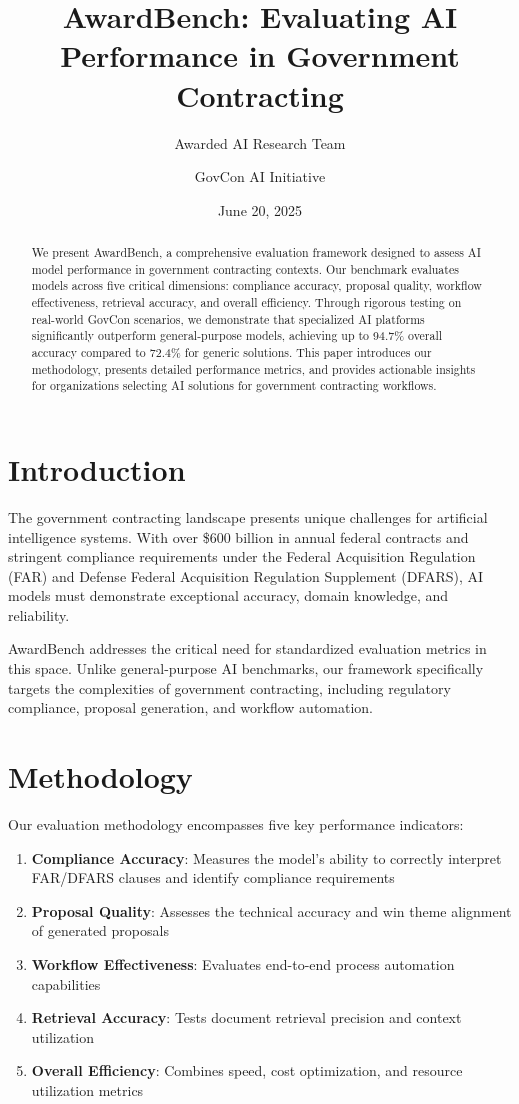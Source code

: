 \documentclass[11pt,a4paper]{article}
\title{AwardBench: Evaluating AI Performance in Government Contracting}
\author{Awarded AI Research Team \and GovCon AI Initiative}
\date{June 20, 2025}
\begin{document}
\maketitle

\begin{abstract}
We present AwardBench, a comprehensive evaluation framework designed to assess AI model performance in government contracting contexts. Our benchmark evaluates models across five critical dimensions: compliance accuracy, proposal quality, workflow effectiveness, retrieval accuracy, and overall efficiency. Through rigorous testing on real-world GovCon scenarios, we demonstrate that specialized AI platforms significantly outperform general-purpose models, achieving up to 94.7\% overall accuracy compared to 72.4\% for generic solutions. This paper introduces our methodology, presents detailed performance metrics, and provides actionable insights for organizations selecting AI solutions for government contracting workflows.
\end{abstract}

\section{Introduction}
The government contracting landscape presents unique challenges for artificial intelligence systems. With over \$600 billion in annual federal contracts and stringent compliance requirements under the Federal Acquisition Regulation (FAR) and Defense Federal Acquisition Regulation Supplement (DFARS), AI models must demonstrate exceptional accuracy, domain knowledge, and reliability.

AwardBench addresses the critical need for standardized evaluation metrics in this space. Unlike general-purpose AI benchmarks, our framework specifically targets the complexities of government contracting, including regulatory compliance, proposal generation, and workflow automation.

\section{Methodology}
Our evaluation methodology encompasses five key performance indicators:

\begin{enumerate}
\item \textbf{Compliance Accuracy}: Measures the model's ability to correctly interpret FAR/DFARS clauses and identify compliance requirements
\item \textbf{Proposal Quality}: Assesses the technical accuracy and win theme alignment of generated proposals
\item \textbf{Workflow Effectiveness}: Evaluates end-to-end process automation capabilities
\item \textbf{Retrieval Accuracy}: Tests document retrieval precision and context utilization
\item \textbf{Overall Efficiency}: Combines speed, cost optimization, and resource utilization metrics
\end{enumerate}
\end{document}
